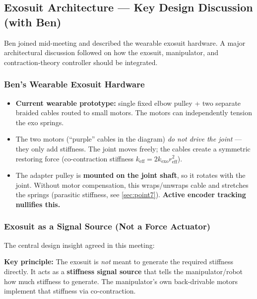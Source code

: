 \documentclass[11pt, a4paper]{article}
\begin{document}
\subsection{Exosuit Architecture --- Key Design Discussion (with Ben)}
\label{sec:exo-architecture}

Ben joined mid-meeting and described the wearable exosuit hardware.  A major
architectural discussion followed on how the exosuit, manipulator, and
contraction-theory controller should be integrated.

\subsubsection*{Ben's Wearable Exosuit Hardware}

\begin{itemize}[nosep]
  \item \textbf{Current wearable prototype:} single fixed elbow pulley +
    two separate braided cables routed to small motors.  The motors can
    independently tension the exo springs.
  \item The two motors (``purple'' cables in the diagram) \emph{do not drive
    the joint} --- they only add stiffness.  The joint moves freely; the
    cables create a symmetric restoring force (co-contraction stiffness
    $k_{\text{eff}} = 2 k_{\text{exo}} r_{\text{eff}}^2$).
  \item The adapter pulley is \textbf{mounted on the joint shaft}, so it
    rotates with the joint.  Without motor compensation, this wraps/unwraps
    cable and stretches the springs (parasitic stiffness, see
    \cref{sec:point7}).  \textbf{Active encoder tracking nullifies this.}
\end{itemize}

\subsubsection*{Exosuit as a Signal Source (Not a Force Actuator)}

The central design insight agreed in this meeting:

\begin{mdframed}[backgroundcolor=blue!5, linecolor=blue!40]
\textbf{Key principle:} The exosuit is \emph{not} meant to generate the
required stiffness directly.  It acts as a \textbf{stiffness signal source}
that tells the manipulator/robot how much stiffness to generate.  The
manipulator's own back-drivable motors implement that stiffness via
co-contraction.
\end{mdframed}
\end{document}
